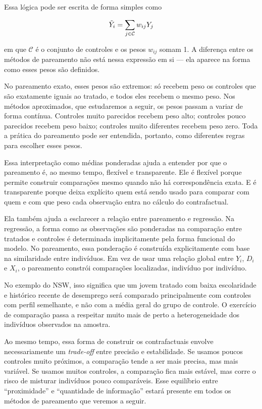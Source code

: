 Essa lógica pode ser escrita de forma simples como

$$
\Tilde{Y}_i = \sum_{j \in \mathcal{C}} w_{ij} Y_j
$$

\noindent em que $\mathcal{C}$ é o conjunto de controles e os pesos $w_{ij}$ somam 1. A diferença entre os métodos de pareamento não está nessa expressão em si --- ela aparece na forma como esses pesos são definidos.

No pareamento exato, esses pesos são extremos: só recebem peso os controles que são exatamente iguais ao tratado, e todos eles recebem o mesmo peso. Nos métodos aproximados, que estudaremos a seguir, os pesos passam a variar de forma contínua. Controles muito parecidos recebem peso alto; controles pouco parecidos recebem peso baixo; controles muito diferentes recebem peso zero. Toda a prática do pareamento pode ser entendida, portanto, como diferentes regras para escolher esses pesos.

Essa interpretação como médias ponderadas ajuda a entender por que o pareamento é, ao mesmo tempo, flexível e transparente. Ele é flexível porque permite construir comparações mesmo quando não há correspondência exata. E é transparente porque deixa explícito quem está sendo usado para comparar com quem e com que peso cada observação entra no cálculo do contrafactual.

Ela também ajuda a esclarecer a relação entre pareamento e regressão. Na regressão, a forma como as observações são ponderadas na comparação entre tratados e controles é determinada implicitamente pela forma funcional do modelo. No pareamento, essa ponderação é construída explicitamente com base na similaridade entre indivíduos. Em vez de usar uma relação global entre $Y_i$, $D_i$ e $X_i$, o pareamento constrói comparações localizadas, indivíduo por indivíduo.

No exemplo do NSW, isso significa que um jovem tratado com baixa escolaridade e histórico recente de desemprego será comparado principalmente com controles com perfil semelhante, e não com a média geral do grupo de controle. O exercício de comparação passa a respeitar muito mais de perto a heterogeneidade dos indivíduos observados na amostra.

Ao mesmo tempo, essa forma de construir os contrafactuais envolve necessariamente um \textit{trade-off} entre precisão e estabilidade. Se usamos poucos controles muito próximos, a comparação tende a ser mais precisa, mas mais variável. Se usamos muitos controles, a comparação fica mais estável, mas corre o risco de misturar indivíduos pouco comparáveis. Esse equilíbrio entre “proximidade” e “quantidade de informação” estará presente em todos os métodos de pareamento que veremos a seguir.

